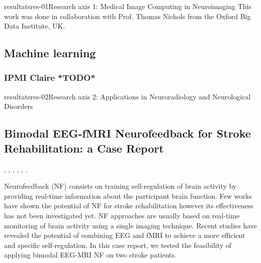 \documentclass{ra2018}
\begin{document}
\begin{module}{resultats}{res-01}{Research axis 1: Medical Image Computing in Neuroimaging}
This work was done in collaboration with Prof. Thomas Nichols from the Oxford Big Data Institute, UK.

\subsection{Machine learning}

\subsubsection{IPMI Claire *TODO*}
\begin{participants}
\end{participants}


\end{module}


\begin{module}{resultats}{res-02}{Research axis 2: Applications in Neuroradiology and Neurological Disorders}

\subsection{Bimodal EEG-fMRI Neurofeedback for Stroke Rehabilitation: a Case Report}
\begin{participants}
      , 
      , 
      ,
      ,
      ,
      .
\end{participants}
Neurofeedback  (NF)  consists  on  training  self-regulation  of  brain  activity  by  providing  real-time information about the participant brain function.  Few works have shown the potential of NF for stroke rehabilitation however its effectiveness has not been investigated yet. NF approaches are usually based on real-time monitoring of brain activity using a single imaging technique.  Recent studies have revealed the potential of combining EEG and fMRI to achieve a more efficient and specific self-regulation. In this case report, we tested the feasibility of applying bimodal EEG-MRI NF on two stroke patients.~\cite{lioi:inserm-01932954}




\end{module}
\end{document}
